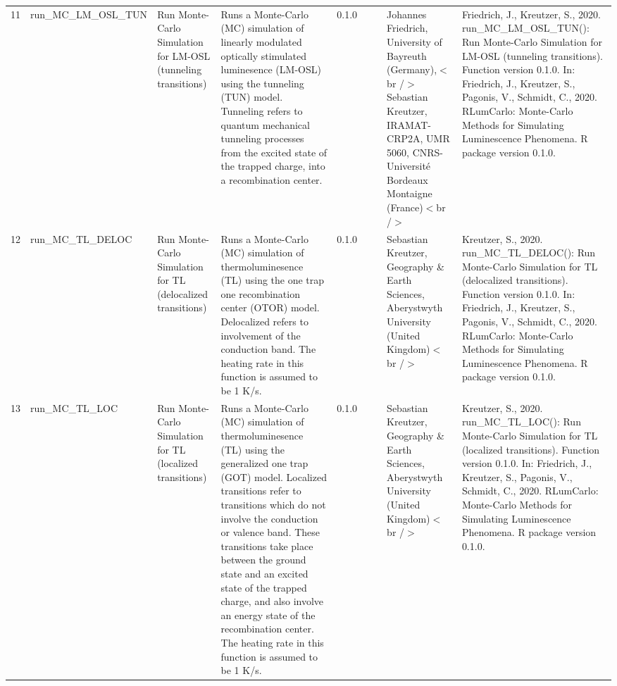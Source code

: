 \begin{table}[ht]
\begin{tabular}{rllllllll}
 \\ 
  11 & run\_MC\_LM\_OSL\_TUN & Run Monte-Carlo Simulation for LM-OSL (tunneling transitions) & Runs a Monte-Carlo (MC) simulation of linearly modulated optically stimulated luminesence (LM-OSL) using the tunneling (TUN) model. Tunneling refers to quantum mechanical tunneling processes from the excited state of the trapped charge, into a recombination center. & 0.1.0
 &  &  & Johannes Friedrich, University of Bayreuth (Germany),$<$br /$>$ Sebastian Kreutzer, IRAMAT-CRP2A, UMR 5060, CNRS-Université Bordeaux Montaigne (France)$<$br /$>$ & Friedrich, J., Kreutzer, S., 2020. run\_MC\_LM\_OSL\_TUN(): Run Monte-Carlo Simulation for LM-OSL (tunneling transitions). Function version 0.1.0. In: Friedrich, J., Kreutzer, S., Pagonis, V., Schmidt, C., 2020. RLumCarlo: Monte-Carlo Methods for Simulating Luminescence Phenomena. R package version 0.1.0. 
 \\ 
  12 & run\_MC\_TL\_DELOC & Run Monte-Carlo Simulation for TL (delocalized transitions) & Runs a Monte-Carlo (MC) simulation of thermoluminesence (TL) using the one trap one recombination center (OTOR) model. Delocalized refers to involvement of the conduction band. The heating rate in this function is assumed to be 1 K/s. & 0.1.0
 &  &  & Sebastian Kreutzer, Geography \& Earth Sciences, Aberystwyth University (United Kingdom)$<$br /$>$ & Kreutzer, S., 2020. run\_MC\_TL\_DELOC(): Run Monte-Carlo Simulation for TL (delocalized transitions). Function version 0.1.0. In: Friedrich, J., Kreutzer, S., Pagonis, V., Schmidt, C., 2020. RLumCarlo: Monte-Carlo Methods for Simulating Luminescence Phenomena. R package version 0.1.0. 
 \\ 
  13 & run\_MC\_TL\_LOC & Run Monte-Carlo Simulation for TL (localized transitions) & Runs a Monte-Carlo (MC) simulation of thermoluminesence (TL) using the generalized one trap (GOT) model. Localized transitions refer to transitions which do not involve the conduction or valence band. These transitions take place between the ground state and an excited state of the trapped charge, and also involve an energy state of the recombination center. The heating rate in this function is assumed to be 1 K/s. & 0.1.0
 &  &  & Sebastian Kreutzer, Geography \& Earth Sciences, Aberystwyth University (United Kingdom)$<$br /$>$ & Kreutzer, S., 2020. run\_MC\_TL\_LOC(): Run Monte-Carlo Simulation for TL (localized transitions). Function version 0.1.0. In: Friedrich, J., Kreutzer, S., Pagonis, V., Schmidt, C., 2020. RLumCarlo: Monte-Carlo Methods for Simulating Luminescence Phenomena. R package version 0.1.0. 

\end{tabular}
\end{table}
